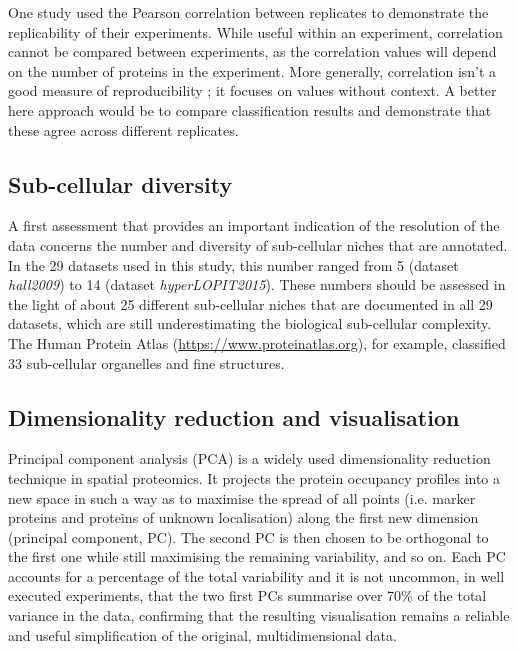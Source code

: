 \documentclass[12pt]{article}\usepackage[]{graphicx}\usepackage[]{color}
\begin{document}
One study \citep{Itzhak:2016} used the Pearson correlation between
replicates to demonstrate the replicability of their
experiments. While useful within an experiment, correlation cannot be
compared between experiments, as the correlation values will depend on
the number of proteins in the experiment. More generally, correlation
isn't a good measure of reproducibility \cite{Irizarry:2015}; it
focuses on values without context. A better here approach would be to
compare classification results and demonstrate that these agree across
different replicates.


\subsection{Sub-cellular diversity}\label{sec:sub-cell-divers}

A first assessment that provides an important indication of the
resolution of the data concerns the number and diversity of
sub-cellular niches that are annotated. In the 29
datasets used in this study, this number ranged from
5 (dataset
\textit{hall2009}) to
14 (dataset
\textit{hyperLOPIT2015}). These numbers
should be assessed in the light of about 25 different sub-cellular
niches that are documented in all 29 datasets, which
are still underestimating the biological sub-cellular complexity.  The
Human Protein Atlas \citep{Thul:2017}
(\url{https://www.proteinatlas.org}), for example, classified 33
sub-cellular organelles and fine structures.

\subsection{Dimensionality reduction and visualisation}\label{sec:vis}

Principal component analysis (PCA) is a widely used dimensionality
reduction technique in spatial proteomics. It projects the protein
occupancy profiles into a new space in such a way as to maximise the
spread of all points (i.e. marker proteins and proteins of unknown
localisation) along the first new dimension (principal component,
PC). The second PC is then chosen to be orthogonal to the first one
while still maximising the remaining variability, and so on. Each PC
accounts for a percentage of the total variability and it is not
uncommon, in well executed experiments, that the two first PCs
summarise over 70\% of the total variance in the data, confirming that
the resulting visualisation remains a reliable and useful
simplification of the original, multidimensional data.
\end{document}

